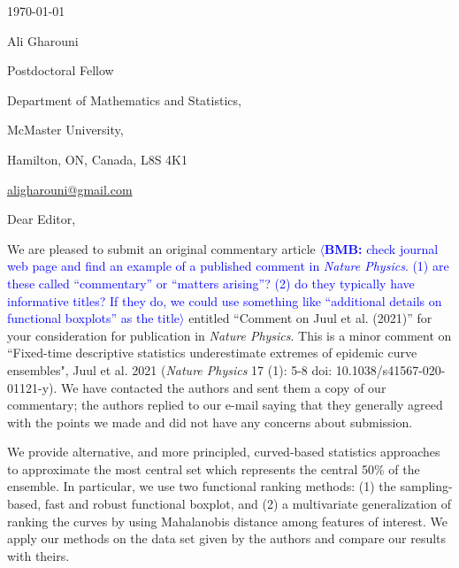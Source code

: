 \documentclass[12pt,letterpaper]{letter}
\newcommand{\bmb}[1]{\textcolor{blue}{$\langle$\textbf{BMB:} #1$\rangle$}}
\newcommand{\journalname}{\emph{Nature Physics}\xspace}
\begin{document}
\begin{multicols}{2}
\footnotesize
\begin{flushleft}

% 

\vfill

{\normalsize \mydate
\today}
\end{flushleft}

\columnbreak

\begin{flushright}
Ali Gharouni

Postdoctoral Fellow 

Department of Mathematics and Statistics,

McMaster University,

Hamilton, ON, Canada, L8S 4K1

\href{mailto:aligharouni@gmail.com}{aligharouni@gmail.com}
\end{flushright}

\end{multicols}

\setlength{\parskip}{1em}
\thispagestyle{empty}

\vspace{-1em}

Dear Editor,

We are pleased to submit an original commentary article
\bmb{check journal web page and find an example of a published comment in \journalname{}. (1) are these called ``commentary'' or ``matters arising''? (2) do they typically have informative titles? If they do, we could use something like ``additional details on functional boxplots'' as the title}
entitled ``Comment on Juul et al. (2021)''
for your consideration for publication in \journalname{}. This is a minor comment on ``Fixed-time descriptive statistics underestimate extremes of epidemic curve ensembles", Juul et al. 2021 (\journalname{} 17 (1): 5-8 doi: 10.1038/s41567-020-01121-y). We have contacted the authors and sent them a copy of our commentary; the authors replied to our e-mail saying that they generally agreed with the points we made and did not have any concerns about submission.

We provide alternative, and more principled, curved-based statistics approaches to approximate the most central set which represents the central 50\% of the ensemble. In particular, we use two functional ranking methods: (1) the sampling-based, fast and robust functional boxplot, and (2) a multivariate generalization of ranking the curves by using Mahalanobis distance among features of interest. We apply our methods on the data set given by the authors and compare our results with theirs.
\end{document}
